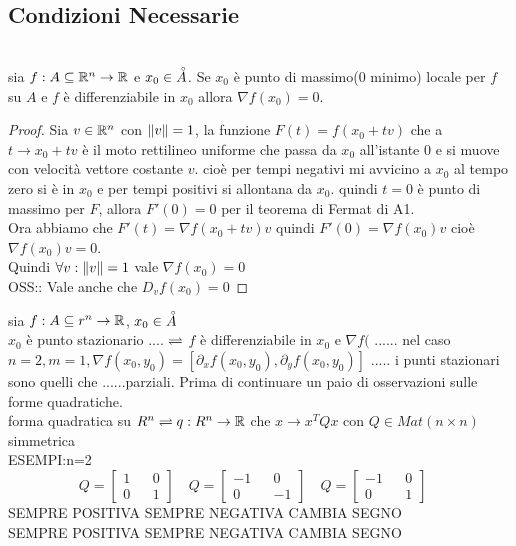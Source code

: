 \subsection{Condizioni Necessarie}
\\
sia $f:A\subseteq \mathbb{R}^n\rightarrow \mathbb{R}$ e $x_0\in\accentset{\circ}{A}$. Se $x_0$ è punto di massimo(0 minimo) locale per $f$ su $A$ e $f$ è differenziabile in $x_0$ allora $\nabla f(x_0)=0$.
\begin{proof}
	Sia $v\in \mathbb{R}^n$ con $\left\|v\right\| =1$, la funzione $F(t)= f(x_0+tv)$ che a $t\rightarrow x_0+tv$ è il moto rettilineo uniforme che passa da $x_0$ all'istante $0$ e si muove con velocità vettore costante $v$. cioè per tempi negativi mi avvicino a $x_0$ al tempo zero si è in $x_0$ e per tempi positivi si allontana da $x_0$. quindi $t=0$ è punto di massimo per $F$, allora $F'(0) = 0$ per il teorema di Fermat di A1.\\
	Ora abbiamo che $F'(t)=\nabla f(x_0+tv)v$ quindi $F'(0)=\nabla f(x_0)v$ cioè $\nabla f(x_0)v=0$.\\
	Quindi $\forall v :\left\|v\right\| =1$ vale $\nabla f(x_0)=0$\\
	OSS:: Vale anche che $D_vf(x_0)=0$
\end{proof}
sia $f:A\subseteq r^n\rightarrow \mathbb{R}$, $x_0\in\accentset{\circ}{A}$\\
$x_0$ è punto stazionario .... $\rightleftharpoons$ $f$ è differenziabile in $x_0$ e $\nabla f($ ......
\observation
nel caso $n=2, m=1, \nabla f(x_0,y_0)=[\partial_xf(x_0,y_0), \partial_yf(x_0,y_0)]$ ..... i punti stazionari sono quelli che ......parziali.
\observation
Prima di continuare un paio di osservazioni sulle forme quadratiche.\\
forma quadratica su $R^n \rightleftharpoons q:R^n\rightarrow \mathbb{R}$ che $x\rightarrow x^TQx$ con $Q\in Mat(n\times n)$ simmetrica\\
ESEMPI:n=2\\
$$
Q=\begin{bmatrix}1&&0\\0&&1\end{bmatrix}\quad
Q=\begin{bmatrix}-1&&0\\0&&-1\end{bmatrix}\quad
Q=\begin{bmatrix}-1&&0\\0&&1\end{bmatrix}\quad 
$$
SEMPRE POSITIVA SEMPRE NEGATIVA CAMBIA SEGNO\\
SEMPRE POSITIVA SEMPRE NEGATIVA CAMBIA SEGNO\\
